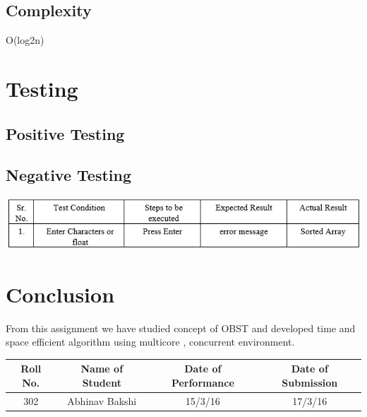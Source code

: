 \documentclass[a4paper,12pt]{article}
\begin{document}
	\subsection{Complexity}
		O(log2n)

\section{Testing}
\subsection{Positive Testing}


\subsection{Negative Testing}
\includegraphics[width=\textwidth]{oddeven_negative}

\vspace{50px}


\section{Conclusion}
From this assignment we have studied concept of OBST and developed time and space efficient algorithm using multicore , concurrent environment.  
\vspace{20px}
\begin{center}
	\begin{tabular}
		{|c|c|c|c|}\hline
		{\bf Roll No.}		&{\bf Name of Student}		&{\bf Date of Performance}  				&{\bf Date of Submission}  \\ \hline
		{302}	&	{Abhinav Bakshi}& 	{15/3/16}	&  {17/3/16}\\ \hline
	\end{tabular}\\ 
\end{center}
\end{document}
